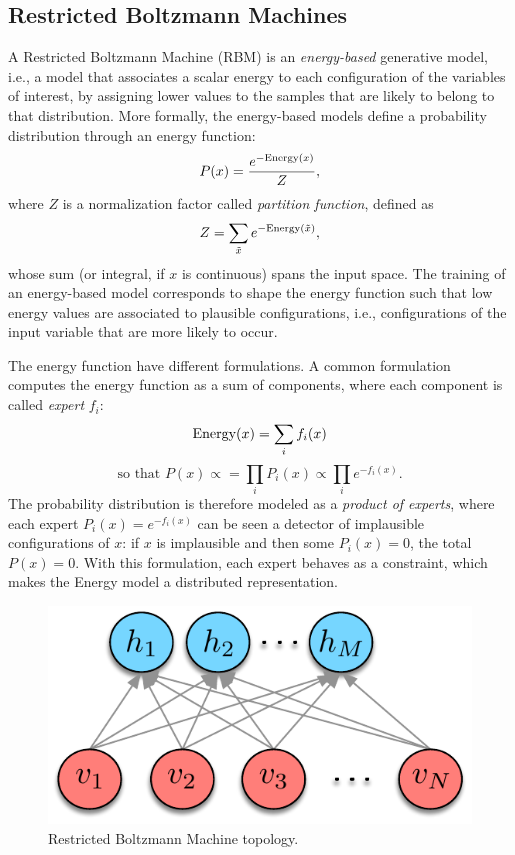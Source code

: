 \subsection{Restricted Boltzmann Machines}\label{sec:Bootleg:deep}
A Restricted Boltzmann Machine (RBM) is an \textit{energy-based} generative model, i.e., a model that associates a scalar energy to each configuration of the variables of interest, by assigning lower values to the samples that are likely to belong to that distribution. More formally, the energy-based models define a probability distribution through an energy function:
\begin{equation}
P(x)=\frac{e^{-\text{Energy}(x)}}{Z},
\label{eq:probEnergy}
\end{equation}
where $Z$ is a normalization factor called \textit{partition function}, defined as 
\begin{equation}
Z=\sum_{\tilde{x}} e^{-\text{Energy}(\tilde{x})},
\end{equation}
whose sum (or integral, if $x$ is continuous) spans the input space. The training of an energy-based model corresponds to shape the energy function such that low energy values are associated to plausible configurations, i.e., configurations of the input variable that are more likely to occur.

The energy function have different formulations. A common formulation computes the energy function as a sum of components, where each component is called \textit{expert} $f_i$:
\begin{equation}
\text{Energy}(x)=\sum_i f_i(x)
\end{equation}
\begin{equation}
\text{so that }P(x)\propto=\prod_i P_i(x) \propto \prod_i e^{-f_i(x)}.
\label{eq:HLFs:experts}
\end{equation}
The probability distribution is therefore modeled as a \textit{product of experts}, where each expert $P_i(x)=e^{-f_i(x)}$ can be seen a detector of implausible configurations of $x$: if $x$ is implausible and then some $P_i(x)=0$, the total $P(x)=0$. With this formulation, each expert behaves as a constraint, which makes the Energy model a distributed representation.

\begin{figure}[tbp]
	\centering
	\includegraphics[width=0.6\columnwidth]{img/Bootleg/RBM_scheme_latexit.pdf}
	\caption{Restricted Boltzmann Machine topology.}
	\label{fig:Bootleg:RBMScheme}
	\vspace{-1em}
\end{figure}

